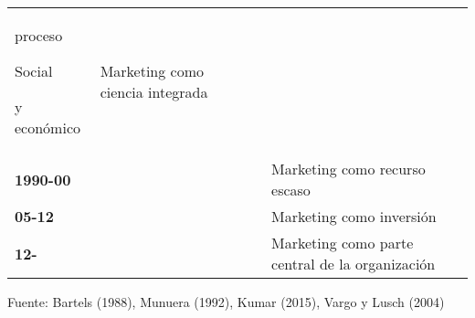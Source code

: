 \begin{longtable}[]{@{}llllll@{}}
\begin{minipage}[t]{0.14\columnwidth}
proceso

Social

y económico\strut
\end{minipage} & \begin{minipage}[t]{0.14\columnwidth}\raggedright
Marketing como ciencia integrada\strut
\end{minipage} & \begin{minipage}[t]{0.14\columnwidth}\raggedright
\strut
\end{minipage}\tabularnewline
\textbf{1990-00} & & & & Marketing como recurso escaso &\tabularnewline
\textbf{05-12} & & & & Marketing como inversión &\tabularnewline
\textbf{12-} & & & & Marketing como parte central de la organización
&\tabularnewline
\bottomrule
\end{longtable}

Fuente: Bartels (1988), Munuera (1992), Kumar (2015), Vargo y Lusch
(2004)
